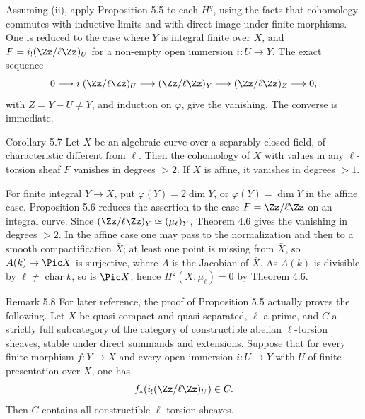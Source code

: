 \begin{prooftext}
Assuming (ii), apply Proposition 5.5 to each \(H^q\), using the facts that cohomology commutes with inductive limits and with direct image under finite morphisms. One is reduced to the case where \(Y\) is integral finite over \(X\), and \(F=i_!(\Zz/\ell\Zz)_U\) for a non-empty open immersion \(i:U\to Y\). The exact sequence
\[
0\longrightarrow i_!(\Zz/\ell\Zz)_U\longrightarrow (\Zz/\ell\Zz)_Y\longrightarrow (\Zz/\ell\Zz)_Z\longrightarrow0,
\]
with \(Z=Y-U\ne Y\), and induction on \(\varphi\), give the vanishing. The converse is immediate.
\end{prooftext}

\begin{statement}{Corollary 5.7}
Let \(X\) be an algebraic curve over a separably closed field, of characteristic different from \(\ell\). Then the cohomology of \(X\) with values in any \(\ell\)-torsion sheaf \(F\) vanishes in degrees \(>2\). If \(X\) is affine, it vanishes in degrees \(>1\).
\end{statement}

For finite integral \(Y\to X\), put \(\varphi(Y)=2\dim Y\), or \(\varphi(Y)=\dim Y\) in the affine case. Proposition 5.6 reduces the assertion to the case \(F=\Zz/\ell\Zz\) on an integral curve. Since \((\Zz/\ell\Zz)_Y\simeq(\mu_\ell)_Y\), Theorem 4.6 gives the vanishing in degrees \(>2\). In the affine case one may pass to the normalization and then to a smooth compactification \(\bar X\); at least one point is missing from \(\bar X\), so \(A(k)\to\Pic X\) is surjective, where \(A\) is the Jacobian of \(\bar X\). As \(A(k)\) is divisible by \(\ell\ne\operatorname{char}k\), so is \(\Pic X\); hence \(H^2(X,\mu_\ell)=0\) by Theorem 4.6.

\begin{remarktext}{Remark 5.8}
For later reference, the proof of Proposition 5.5 actually proves the following. Let \(X\) be quasi-compact and quasi-separated, \(\ell\) a prime, and \(C\) a strictly full subcategory of the category of constructible abelian \(\ell\)-torsion sheaves, stable under direct summands and extensions. Suppose that for every finite morphism \(f:Y\to X\) and every open immersion \(i:U\to Y\) with \(U\) of finite presentation over \(X\), one has
\[
f_*(i_!(\Zz/\ell\Zz)_U)\in C.
\]
Then \(C\) contains all constructible \(\ell\)-torsion sheaves.
\end{remarktext}

